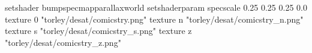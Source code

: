 setshader bumpspecmapparallaxworld
setshaderparam specscale 0.25 0.25 0.25 0.0
texture 0 "torley/desat/comicstry.png"
texture n "torley/desat/comicstry_n.png"
texture s "torley/desat/comicstry_s.png"
texture z "torley/desat/comicstry_z.png"

